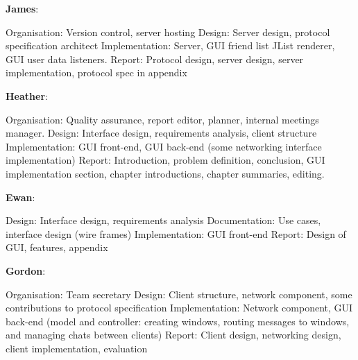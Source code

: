 \label{sumlog}

{\bf James}:

Organisation: Version control, server hosting
Design: Server design, protocol specification architect
Implementation: Server, GUI friend list JList renderer, GUI user data listeners.
Report: Protocol design, server design, server implementation, protocol spec in appendix

{\bf Heather}:

Organisation: Quality assurance, report editor, planner, internal meetings manager.
Design: Interface design, requirements analysis, client structure
Implementation: GUI front-end, GUI back-end (some networking interface implementation)
Report: Introduction, problem definition, conclusion, GUI implementation section, chapter introductions, chapter summaries, editing. 

{\bf Ewan}:

Design: Interface design, requirements analysis
Documentation: Use cases, interface design (wire frames)
Implementation: GUI front-end
Report: Design of GUI, features, appendix

{\bf Gordon}:

Organisation: Team secretary
Design: Client structure, network component, some contributions to protocol specification
Implementation: Network component, GUI back-end (model and controller: creating windows, routing messages to windows, and managing chats between clients)
Report: Client design, networking design, client implementation, evaluation
